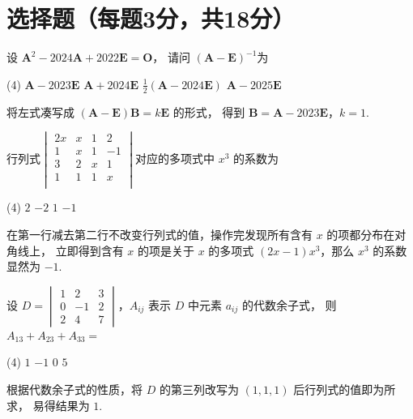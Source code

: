 \section{选择题（每题3分，共18分）}
\begin{problem}
  设 $\mathbf A^2 - 2024\mathbf A + 2022\mathbf E = \mathbf O$，
  请问 $(\mathbf A - \mathbf E)^{-1}$为
  \begin{tasks}(4)
    \task[\true] $\mathbf A - 2023\mathbf E$
    \task $\mathbf A + 2024\mathbf E$
    \task $\frac12(\mathbf A-2024\mathbf E)$
    \task $\mathbf A - 2025\mathbf E$
  \end{tasks}
\end{problem}
\scratch
\begin{solution}
  将左式凑写成 $(\mathbf A - \mathbf E)\mathbf B = k\mathbf E$ 的形式，
  得到 $\mathbf B = \mathbf A - 2023\mathbf E$，$k = 1$.
\end{solution}

\begin{problem}
  行列式$
  \begin{vmatrix}
    2x & x & 1 & 2 \\
    1  & x & 1 & -1\\
    3  & 2 & x & 1 \\
    1  & 1 & 1 & x \\
  \end{vmatrix}$对应的多项式中 $x^3$ 的系数为
  \begin{tasks}(4)
    \task $2$
    \task $-2$
    \task $1$
    \task[\true] $-1$
 \end{tasks}
\end{problem}
\scratch
\begin{solution}
  在第一行减去第二行不改变行列式的值，操作完发现所有含有 $x$ 的项都分布在对角线上，
  立即得到含有 $x$ 的项是关于 $x$ 的多项式 $(2x-1)x^3$，那么 $x^3$ 的系数显然为 $-1$.
\end{solution}

\begin{problem}
  设 $D =
  \begin{vmatrix}
    1 & 2  & 3\\
    0 & -1 & 2\\
    2 & 4  & 7
  \end{vmatrix}$，$A_{i j}$ 表示 $D$ 中元素 $a_{ij}$ 的代数余子式，
  则 $A_{13} + A_{23} + A_{33} = $
  \begin{tasks}(4)
    \task[\true] $1$
    \task $-1$
    \task $0$
    \task $5$
  \end{tasks}
\end{problem}
\scratch
\begin{solution}
  根据代数余子式的性质，将 $D$ 的第三列改写为 $(1,1,1)$ 后行列式的值即为所求，
  易得结果为 $1$.
\end{solution}

